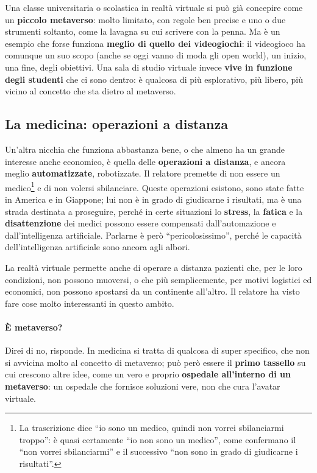 Una classe universitaria o scolastica in realtà virtuale si può già concepire
come un \textbf{piccolo metaverso}: molto limitato, con regole ben precise e uno
o due strumenti soltanto, come la lavagna su cui scrivere con la penna. Ma è un
esempio che forse funziona \textbf{meglio di quello dei videogiochi}: il
videogioco ha comunque un suo scopo (anche se oggi vanno di moda gli open
world), un inizio, una fine, degli obiettivi. Una sala di studio virtuale invece
\textbf{vive in funzione degli studenti} che ci sono dentro: è qualcosa di più
esplorativo, più libero, più vicino al concetto che sta dietro al metaverso.

\subsection{La medicina: operazioni a distanza}

Un'altra nicchia che funziona abbastanza bene, o che almeno ha un grande
interesse anche economico, è quella delle \textbf{operazioni a distanza}, e
ancora meglio \textbf{automatizzate}, robotizzate. Il relatore premette di non
essere un medico\footnote{La trascrizione dice ``io sono un medico, quindi non
vorrei sbilanciarmi troppo'': è quasi certamente ``io non sono un medico'', come
confermano il ``non vorrei sbilanciarmi'' e il successivo ``non sono in grado di
giudicarne i risultati''.} e di non volersi sbilanciare. Queste operazioni
esistono, sono state fatte in America e in Giappone; lui non è in grado di
giudicarne i risultati, ma è una strada destinata a proseguire, perché in certe
situazioni lo \textbf{stress}, la \textbf{fatica} e la \textbf{disattenzione}
dei medici possono essere compensati dall'automazione e dall'intelligenza
artificiale. Parlarne è però ``pericolosissimo'', perché le capacità
dell'intelligenza artificiale sono ancora agli albori.

La realtà virtuale permette anche di operare a distanza pazienti che, per le
loro condizioni, non possono muoversi, o che più semplicemente, per motivi
logistici ed economici, non possono spostarsi da un continente all'altro. Il
relatore ha visto fare cose molto interessanti in questo ambito.

\paragraph{È metaverso?} Direi di no, risponde. In medicina si tratta di
qualcosa di super specifico, che non si avvicina molto al concetto di metaverso;
può però essere il \textbf{primo tassello} su cui crescono altre idee, come un
vero e proprio \textbf{ospedale all'interno di un metaverso}: un ospedale che
fornisce soluzioni vere, non che cura l'avatar virtuale.

